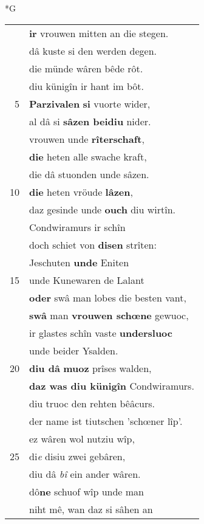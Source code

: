 \documentclass[8pt,a4paper,notitlepage]{article}
\begin{document}
\newpage
\begin{table}[ht]
\begin{minipage}[t]{0.5\linewidth}
\small
\begin{center}*G
\end{center}
\begin{tabular}{rl}
 & \textbf{ir} vrouwen mitten an die stegen.\\ 
 & dâ kuste si den werden degen.\\ 
 & die münde wâren bêde rôt.\\ 
 & diu künigîn ir hant im bôt.\\ 
5 & \textbf{Parzivalen} \textbf{si} vuorte wider,\\ 
 & al dâ si \textbf{sâzen beidiu} nider.\\ 
 & vrouwen unde \textbf{rîterschaft},\\ 
 & \textbf{die} heten alle swache kraft,\\ 
 & die dâ stuonden unde sâzen.\\ 
10 & \textbf{die} heten vröude \textbf{lâzen},\\ 
 & daz gesinde unde \textbf{ouch} diu wirtîn.\\ 
 & Condwiramurs ir schîn\\ 
 & doch schiet von \textbf{disen} strîten:\\ 
 & Jeschuten \textbf{unde} Eniten\\ 
15 & unde Kunewaren de Lalant\\ 
 & \textbf{oder} swâ man lobes die besten vant,\\ 
 & \textbf{swâ} man \textbf{vrouwen schœne} gewuoc,\\ 
 & ir glastes schîn vaste \textbf{undersluoc}\\ 
 & unde beider Ysalden.\\ 
20 & \textbf{diu dâ} \textbf{muoz} prîses walden,\\ 
 & \textbf{daz was diu künigîn} Condwiramurs.\\ 
 & diu truoc den rehten bêâcurs.\\ 
 & der name ist tiutschen 'schœner lîp'.\\ 
 & ez wâren wol nutziu wîp,\\ 
25 & di\textit{e} disiu zwei gebâren,\\ 
 & diu dâ \textit{bî} ein ander wâren.\\ 
 & dô\textbf{ne} schuof wîp unde man\\ 
 & niht mê, wan daz si sâhen an\\ 

\end{tabular}
\end{minipage}
\end{table}
\end{document}
